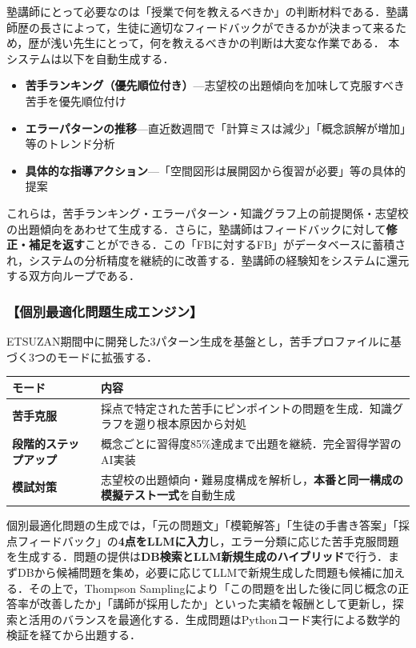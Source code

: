 \documentclass[paper=a4,fontsize=10.5bp,jafontsize=10.5bp,twocolumn]{jlreq}
\begin{document}
塾講師にとって必要なのは「授業で何を教えるべきか」の判断材料である．塾講師歴の長さによって，生徒に適切なフィードバックができるかが決まって来るため，歴が浅い先生にとって，何を教えるべきかの判断は大変な作業である．
本システムは以下を自動生成する．

\begin{itemize}
  \item \textbf{苦手ランキング（優先順位付き）}---志望校の出題傾向を加味して克服すべき苦手を優先順位付け
  \item \textbf{エラーパターンの推移}---直近数週間で「計算ミスは減少」「概念誤解が増加」等のトレンド分析
  \item \textbf{具体的な指導アクション}---「空間図形は展開図から復習が必要」等の具体的提案
\end{itemize}

これらは，苦手ランキング・エラーパターン・知識グラフ上の前提関係・志望校の出題傾向をあわせて生成する．さらに，塾講師はフィードバックに対して\textbf{修正・補足を返す}ことができる．この「FBに対するFB」がデータベースに蓄積され，システムの分析精度を継続的に改善する．塾講師の経験知をシステムに還元する双方向ループである．

\subsubsection{【個別最適化問題生成エンジン】}

ETSUZAN期間中に開発した3パターン生成を基盤とし，苦手プロファイルに基づく3つのモードに拡張する．

\begin{scriptsize}\noindent
\begin{tabularx}{\linewidth}{>{\bfseries}l X}
\toprule
モード & 内容 \\
\midrule
苦手克服 & 採点で特定された苦手にピンポイントの問題を生成．知識グラフを遡り根本原因から対処 \\
段階的ステップアップ & 概念ごとに習得度85\%達成まで出題を継続．完全習得学習のAI実装 \\
模試対策 & 志望校の出題傾向・難易度構成を解析し，\textbf{本番と同一構成の模擬テスト一式}を自動生成 \\
\bottomrule
\end{tabularx}
\end{scriptsize}

個別最適化問題の生成では，「元の問題文」「模範解答」「生徒の手書き答案」「採点フィードバック」の\textbf{4点をLLMに入力}し，エラー分類に応じた苦手克服問題を生成する．問題の提供は\textbf{DB検索とLLM新規生成のハイブリッド}で行う．まずDBから候補問題を集め，必要に応じてLLMで新規生成した問題も候補に加える．その上で，Thompson Samplingにより「この問題を出した後に同じ概念の正答率が改善したか」「講師が採用したか」といった実績を報酬として更新し，探索と活用のバランスを最適化する．生成問題はPythonコード実行による数学的検証を経てから出題する．
\end{document}
